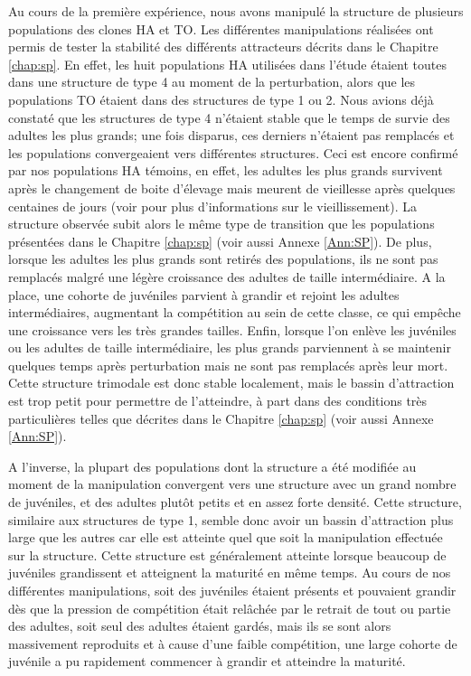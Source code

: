 Au cours de la première expérience, nous avons manipulé la structure de
plusieurs populations des clones HA et TO. Les différentes manipulations
réalisées ont permis de tester la stabilité des différents attracteurs décrits
dans le Chapitre \ref{chap:sp}. En effet, les huit populations HA utilisées
dans l'étude étaient toutes dans une structure de type 4 au moment de la
perturbation, alors que les populations TO étaient dans des structures de type 1
ou 2. Nous avions déjà constaté que les structures de type 4 n'étaient stable
que le temps de survie des adultes les plus grands; une fois disparus,
ces derniers n'étaient pas remplacés et les populations convergeaient vers
différentes structures. Ceci est encore confirmé par nos populations HA témoins,
en effet, les adultes les plus grands survivent après le changement de boite
d'élevage mais meurent de vieillesse après quelques centaines de jours (voir
\autocites{mallard2013b} pour plus d'informations sur le vieillissement).
La structure observée subit alors le même type de transition que les populations présentées
dans le Chapitre \ref{chap:sp} (voir aussi Annexe \ref{Ann:SP}). De plus,
lorsque les adultes les plus grands sont retirés des populations, ils ne sont pas remplacés malgré une légère
croissance des adultes de taille intermédiaire. A la place, une cohorte de
juvéniles parvient à grandir et rejoint les adultes intermédiaires, augmentant
la compétition au sein de cette classe, ce qui empêche une croissance vers les
très grandes tailles. Enfin, lorsque l'on enlève les juvéniles ou les adultes
de taille intermédiaire, les plus grands parviennent à se maintenir quelques
temps après perturbation mais ne sont pas remplacés après leur mort. Cette
structure trimodale est donc stable localement, mais le bassin d'attraction est
trop petit pour permettre de l'atteindre, à part dans des conditions très
particulières telles que décrites dans le Chapitre \ref{chap:sp} (voir aussi
Annexe \ref{Ann:SP}).

A l'inverse, la plupart des populations dont la structure a été modifiée au
moment de la manipulation convergent vers une structure avec un grand nombre de
juvéniles, et des adultes plutôt petits et en assez forte densité. Cette
structure, similaire aux structures de type 1, semble donc avoir un bassin
d'attraction plus large que les autres car elle est atteinte quel que soit la
manipulation effectuée sur la structure. Cette structure est généralement
atteinte lorsque beaucoup de juvéniles grandissent et atteignent la maturité en
même temps. Au cours de nos différentes manipulations, soit des juvéniles
étaient présents et pouvaient grandir dès que la pression de compétition était
relâchée par le retrait de tout ou partie des adultes, soit seul des adultes
étaient gardés, mais ils se sont alors massivement reproduits et à cause d'une
faible compétition, une large cohorte de juvénile a pu rapidement commencer à
grandir et atteindre la maturité. 

